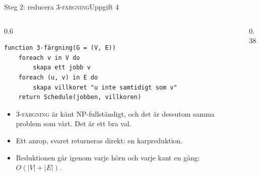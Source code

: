 \documentclass[aspectratio=169,10pt]{beamer}
\newcommand{\prob}[1]{\textsc{#1}}
\begin{document}
\begin{frame}[fragile]{Steg 2: reducera \prob{3-färgning}}{Uppgift 4}
  \begin{columns}[T]
    \begin{column}{0.6\textwidth}
\begin{lstlisting}
function 3-färgning(G = (V, E))
    foreach v in V do
        skapa ett jobb v
    foreach (u, v) in E do
        skapa villkoret "u inte samtidigt som v"
    return Schedule(jobben, villkoren)
\end{lstlisting}
      \begin{itemize}
        \item<2-> \prob{3-färgning} är känt NP-fullständigt, och det är dessutom samma problem som vårt. Det är ett bra val.
        \item<3-> Ett anrop, svaret returneras direkt: en karpreduktion.
        \item<4-> Reduktionen går igenom varje hörn och varje kant en gång: $O(|V|+|E|)$.
      \end{itemize}
    \end{column}
    \begin{column}{0.38\textwidth}
      \centering
    \end{column}
  \end{columns}
\end{frame}
\end{document}
